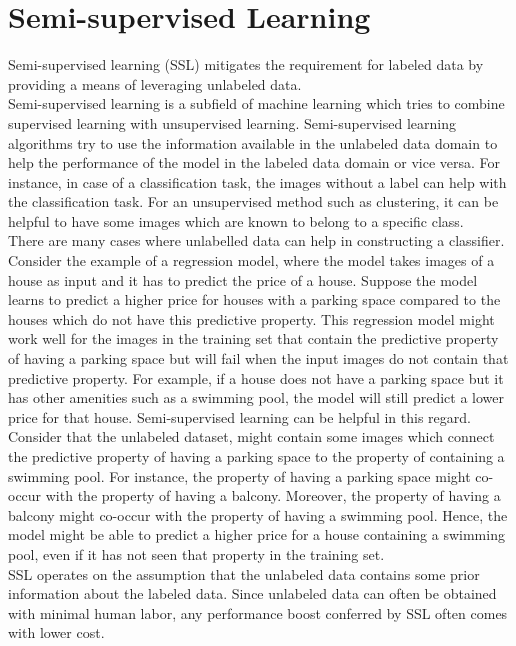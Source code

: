 \section{Semi-supervised Learning}
Semi-supervised learning (SSL) \cite{van2020} mitigates the requirement for labeled data by providing a means of leveraging unlabeled data. \\ Semi-supervised learning is a subfield of machine learning which tries to combine supervised learning with unsupervised learning. Semi-supervised learning algorithms try to use the information available in the unlabeled data domain to help the performance of the model in the labeled data domain or vice versa. For instance, in case of a classification task, the images without a label can help with the classification task. For an unsupervised method such as clustering, it can be helpful to have some images which are known to belong to a specific class. \\
There are many cases where unlabelled data can help in constructing a classifier. Consider the example of a regression model, where the model takes images of a house as input and it has to predict the price of a house. Suppose the model learns to predict a higher price for houses with a parking space compared to the houses which do not have this predictive property. This regression model might work well for the images in the training set that contain the predictive property of having a parking space but will fail when the input images do not contain that predictive property. For example, if a house does not have a parking space but it has other amenities such as a swimming pool, the model will still predict a lower price for that house. Semi-supervised learning can be helpful in this regard. Consider that the unlabeled dataset, might contain some images which connect the predictive property of having a parking space to the property of containing a swimming pool. For instance, the property of having a parking space might co-occur with the property of having a balcony. Moreover, the property of having a balcony might co-occur with the property of having a swimming pool. Hence, the model might be able to predict a higher price for a house containing a swimming pool, even if it has not seen that property in the training set.\\
SSL operates on the assumption that the unlabeled data contains some prior information about the labeled data. Since unlabeled data can often be obtained with minimal human labor, any performance boost conferred by SSL often comes with lower cost. \\

